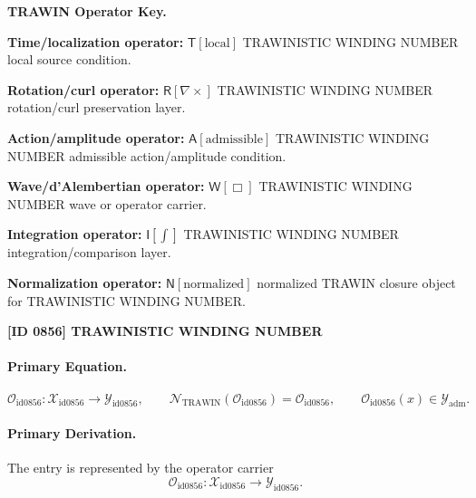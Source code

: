 \par\vspace{0.45\baselineskip}
\noindent\begin{minipage}[t]{\linewidth}
\begingroup
\small
\raggedright
\textbf{TRAWIN Operator Key.}\par
\noindent\textbf{Time/localization operator:} $\mathsf{T}\!\left[\mathrm{local}\right]$ TRAWINISTIC WINDING NUMBER local source condition.\par
\noindent\textbf{Rotation/curl operator:} $\mathsf{R}\!\left[\nabla\times\right]$ TRAWINISTIC WINDING NUMBER rotation/curl preservation layer.\par
\noindent\textbf{Action/amplitude operator:} $\mathsf{A}\!\left[\mathrm{admissible}\right]$ TRAWINISTIC WINDING NUMBER admissible action/amplitude condition.\par
\noindent\textbf{Wave/d'Alembertian operator:} $\mathsf{W}\!\left[\Box\right]$ TRAWINISTIC WINDING NUMBER wave or operator carrier.\par
\noindent\textbf{Integration operator:} $\mathsf{I}\!\left[\int\right]$ TRAWINISTIC WINDING NUMBER integration/comparison layer.\par
\noindent\textbf{Normalization operator:} $\mathsf{N}\!\left[\mathrm{normalized}\right]$ normalized TRAWIN closure object for TRAWINISTIC WINDING NUMBER.\par
\endgroup
\end{minipage}

\clearpage
\noindent\textbf{[ID 0856] TRAWINISTIC WINDING NUMBER}\par
\vspace{0.35em}
\paragraph{Primary Equation.}
\[
\mathcal{O}_{\mathrm{id0856}}:\mathcal{X}_{\mathrm{id0856}}\longrightarrow \mathcal{Y}_{\mathrm{id0856}},\qquad
\mathcal{N}_{\mathrm{TRAWIN}}(\mathcal{O}_{\mathrm{id0856}})=\mathcal{O}_{\mathrm{id0856}},\qquad
\mathcal{O}_{\mathrm{id0856}}(x)\in\mathcal{Y}_{\mathrm{adm}}.
\]

\paragraph{Primary Derivation.} The entry is represented by the operator carrier\[
\mathcal{O}_{\mathrm{id0856}}:\mathcal{X}_{\mathrm{id0856}}\longrightarrow \mathcal{Y}_{\mathrm{id0856}}.
\]

